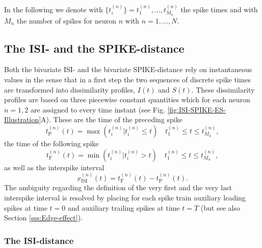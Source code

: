 \documentclass[10pt,twocolumn]{elsart5p}
\begin{document}
In the following we denote with $\{t_i^{(n)}\} = {t_1^{(n)},...,t_{M_n}^{(n)}}$ the spike times and with $M_n$ the number of spikes for neuron $n$ with $n = 1,...,N$.


\subsection{\label{ss:ISI-SPIKE-Distance} The ISI- and the SPIKE-distance}

Both the bivariate ISI- and the bivariate SPIKE-distance rely on instantaneous values in the sense that in a first step the two sequences of discrete spike times are transformed into dissimilarity profiles, $I (t)$ and $S (t)$. These dissimilarity profiles are based on three piecewise constant quantities which for each neuron $n = 1, 2$ are assigned to every time instant (see Fig. \ref{fig:ISI-SPIKE-ES-Illustration}A). These are the time of the preceding spike
%
\begin{equation} \label{eq:Prev-Spike}
    t_{\mathrm {P}}^{(n)} (t) = \max(t_i^{(n)} | t_i^{(n)} \leq t)  \quad t_1^{(n)} \leq t \leq t_{M_n}^{(n)},
\end{equation}
%
the time of the following spike
%
\begin{equation} \label{eq:Foll-Spike}
    t_{\mathrm {F}}^{(n)} (t) = \min(t_i^{(n)} | t_i^{(n)} > t)  \quad t_1^{(n)} \leq t \leq t_{M_n}^{(n)},
\end{equation}
%
as well as the interspike interval
%
\begin{equation} \label{eq:ISI}
    x_{\mathrm {ISI}}^{(n)} (t) = t_{\mathrm {F}}^{(n)} (t) - t_{\mathrm {P}}^{(n)} (t).
\end{equation}
%
The ambiguity regarding the definition of the very first and the very last interspike interval is resolved by placing for each spike train auxiliary leading spikes at time $t = 0$ and auxiliary trailing spikes at time $t = T$ (but see also Section \ref{sss:Edge-effect}).


\subsubsection{\label{sss:ISI-Distance} The ISI-distance}
\end{document}
